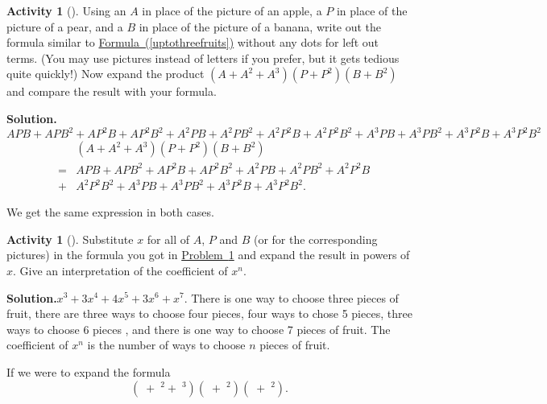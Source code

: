 \documentclass[10pt,]{book}
\theoremstyle{plain}
\theoremstyle{definition}
\newtheorem{activity}[project]{Activity}
\numberwithin{equation}{chapter}
\newcommand{\apple}{\text{🍎}}
\newcommand{\ap}{\apple}
\newcommand{\banana}{\text{🍌}}
\newcommand{\ba}{\banana}
\newcommand{\pear}{\text{🍐}}
\newcommand{\pe}{\pear}
\newcommand{\amp}{&}
\begin{document}
%
\begin{activity}[]\label{twopiecesoffruit}
Using an \(A\) in place of the picture of an apple, a \(P\) in place of the picture of a pear, and a \(B\) in place of the picture of a banana, write out the formula similar to \hyperref[uptothreefruits]{Formula~(\ref{uptothreefruits})} without any dots for left out terms. (You may use pictures instead of letters if you prefer, but it gets tedious quite quickly!) Now expand the product \((A+A^2+A^3)(P+P^2)(B+B^2)\) and compare the result with your formula.%
\par\medskip\noindent%
\textbf{Solution.}\quad \(APB+APB^2 +AP^2B+ AP^2B^2+ A^2PB+A^2PB^2+ A^2P^2B+ A^2P^2B^2+
A^3PB+A^3PB^2 +A^3P^2B+ A^3P^2B^2\)%
\begin{align*}
\amp \amp (A+A^2+A^3)(P+P^2)(B+B^2)\\
\amp =\amp APB+APB^2+AP^2B+AP^2B^2+A^2PB+A^2PB^2+A^2P^2B\\
\amp +\amp A^2P^2B^2+
A^3PB+A^3PB^2+A^3P^2B+A^3P^2B^2.
\end{align*}
%
\par
We get the same expression in both cases.%
\end{activity}
\begin{activity}[]\label{activity-152}
Substitute \(x\) for all of \(A\), \(P\) and \(B\) (or for the corresponding pictures) in the formula you got in \hyperref[twopiecesoffruit]{Problem~\ref{twopiecesoffruit}} and expand the result in powers of \(x\). Give an interpretation of the coefficient of \(x^n\).%
\par\medskip\noindent%
\textbf{Solution.}\quad \(x^3+3x^4+4x^5+3x^6+x^7\). There is one way to choose three pieces of fruit, there are three ways to choose four pieces, four ways to chose 5 pieces, three ways to choose 6 pieces , and there is one way to choose 7 pieces of fruit. The coefficient of \(x^n\) is the number of ways to choose \(n\) pieces of fruit.%
\end{activity}
If we were to expand the formula%
\begin{equation}
(\ap+\ap^2+\ap^3)(\pe+\pe^2)(\ba+\ba^2).\label{threefruitsagain}
\end{equation}
\end{document}

